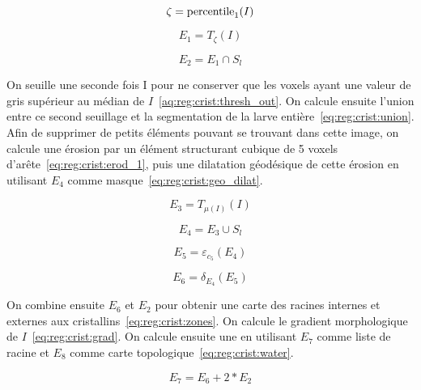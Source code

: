 \documentclass[\main/main.tex]{subfiles}
\begin{document}
\begin{equation}
    \label{eq:reg:crist:percentile}
    \zeta = \operatorname{\textnormal{percentile}}_1(I) 
\end{equation}

\begin{equation}
    \label{eq:reg:crist:thresh_in}
    E_1= T_{\zeta}(I) 
\end{equation}

\begin{equation}
    \label{eq:reg:crist:intersection}
    E_2 = E_1 \cap S_l
\end{equation}

%
On seuille une seconde fois I pour ne conserver que les voxels ayant une valeur de gris supérieur au médian de $I$~\eqref{aq:reg:crist:thresh_out}.
%
On calcule ensuite l'union entre ce second seuillage et la segmentation de la larve entière~\eqref{eq:reg:crist:union}.
%
Afin de supprimer de petits éléments pouvant se trouvant dans cette image, on calcule une érosion par un élément structurant cubique de 5 voxels d'arête~\eqref{eq:reg:crist:erod_1}, puis une dilatation géodésique de cette érosion en utilisant $E_4$ comme masque~\eqref{eq:reg:crist:geo_dilat}.

\begin{equation}
    \label{eq:reg:crist:thresh_in}
    E_3= T_{\mu(I)}(I) 
\end{equation}

\begin{equation}
    \label{eq:reg:crist:union}
    E_4= E_3 \cup S_l
\end{equation}

\begin{equation}
    \label{eq:reg:crist:erod_1}
    E_5= \varepsilon_{c_5}(E_4)
\end{equation}

\begin{equation}
    \label{eq:reg:crist:geo_dilat}
    E_6= \delta_{E_4}(E_5)
\end{equation}

%
On combine ensuite $E_6$ et $E_2$ pour obtenir une carte des racines internes et externes aux cristallins~\eqref{eq:reg:crist:zones}.
%
On calcule le gradient morphologique de $I$~\eqref{eq:reg:crist:grad}.
%
On calcule ensuite une \watershed{} en utilisant $E_7$ comme liste de racine et $E_8$ comme carte topologique~\eqref{eq:reg:crist:water}.

\begin{equation}
    \label{eq:reg:crist:zones}
    E_7= E_6 + 2 * E_2
\end{equation}
\end{document}

